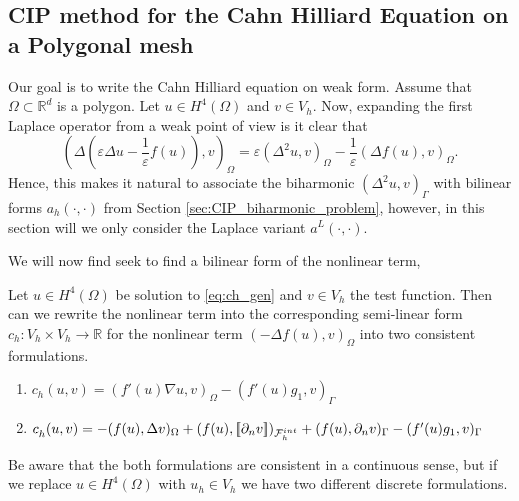 \subsection{ CIP method for the Cahn Hilliard Equation on a Polygonal mesh}%
\label{sub:writing_the_cahn_hilliard_equation_of_weak_form}

Our goal is to write the Cahn Hilliard equation on weak form.
Assume that $\Omega  \subset \mathbb{R} ^{d}$ is a polygon.
 Let $u \in  H^{4}( \Omega ) $ and $v \in V_{h} $.
Now, expanding the first Laplace operator from a weak point of view is it clear that
\[
 ( \Delta ( \varepsilon  \Delta u - \frac{1}{\varepsilon } f( u) ) ,v )_{\Omega } = \varepsilon ( \Delta^{2} u ,v )_{\Omega } - \frac{1}{\varepsilon } ( \Delta f( u)  ,v )_{\Omega }.
\]
Hence, this makes it natural to associate the biharmonic $( \Delta ^2 u,v)_{\Gamma } $ with bilinear forms $a_{h}( \cdot ,\cdot ) $ from Section \ref{sec:CIP_biharmonic_problem}, however, in this section will we only consider the Laplace
variant $a^{L}( \cdot ,\cdot ) $.

We will now find seek to find a bilinear form of the nonlinear term,
\begin{lemma}
    Let $u \in H^4( \Omega ) $ be solution to \eqref{eq:ch_gen} and $v \in V_{h}$ the test function.
Then can we rewrite the nonlinear term into the corresponding semi-linear form $c_{h}:V_{h} \times  V_{h} \to \mathbb{R} $  for the nonlinear term $( -\Delta f( u) , v)_{\Omega }$ into two consistent formulations.
\begin{enumerate}[label=\arabic*)]
    \item  $c^{}_{h} ( u,v)  = ( f' ( u) \nabla u, v )_{\Omega }  - ( f'( u)  g_{1}   ,  v)_{\Gamma }$
    \item
        $c^{}_{h} ( u,v)  = -( f( u), \Delta v )_{\Omega }+  ( f( u) , \left[\!\left[  \partial _{n}v  \right]\!\right]  )_{\mathcal{F} _{h}^{int}} + ( f(u), \partial _{n} v)_{\Gamma  }  - ( f'( u)  g_{1}   ,  v)_{\Gamma }$
\end{enumerate}
\begin{remark}
    Be aware that the both formulations are consistent in a continuous sense, but if we replace $u \in H^{4}( \Omega ) $ with  $u_{h} \in  V_{h}$ we have two different discrete formulations.
\end{remark}

\end{lemma}

